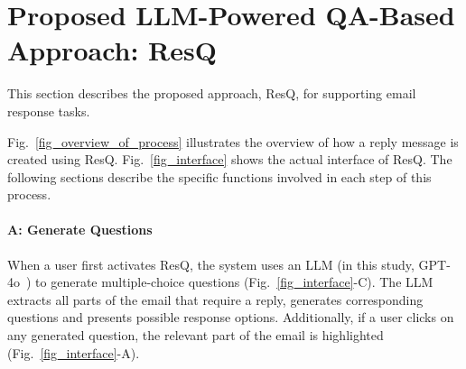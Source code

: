 
\section{Proposed LLM-Powered QA-Based Approach: ResQ}
\label{sec:Proposed_Approach}
This section describes the proposed approach, ResQ, for supporting email response tasks. 


Fig.~\ref{fig_overview_of_process} illustrates the overview of how a reply message is created using ResQ.
Fig.~\ref{fig_interface} shows the actual interface of ResQ.
The following sections describe the specific functions involved in each step of this process.

\paragraph{\textbf{A: Generate Questions}}
\label{sec:generate_questions}
When a user first activates ResQ, the system uses an LLM (in this study, GPT-4o~\cite{GPT4o}) to generate multiple-choice questions (Fig.~\ref{fig_interface}-C). 
The LLM extracts all parts of the email that require a reply, generates corresponding questions and presents possible response options.
Additionally, if a user clicks on any generated question, the relevant part of the email is highlighted (Fig.~\ref{fig_interface}-A).

